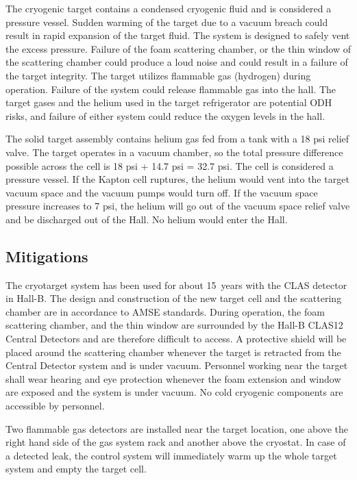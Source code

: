 The cryogenic target contains a condensed cryogenic fluid and is considered a pressure vessel. 
Sudden warming of the target due to a vacuum breach could result in rapid expansion of the 
target fluid. The system is designed to safely vent the excess pressure. Failure of the 
foam scattering chamber, or the thin window of the scattering chamber could produce a loud 
noise and could result in a failure of the target integrity. The target utilizes flammable 
gas (hydrogen) during operation. Failure of the system could release flammable gas into the 
hall. The target gases and the helium used in the target refrigerator are potential 
ODH risks, and failure of either system could reduce the oxygen levels in the hall.

The solid target assembly contains helium gas fed from a tank with a 18 psi relief valve.  The target operates in a vacuum chamber, so the total pressure difference possible across the cell is 18 psi + 14.7 psi = 32.7 psi.  The cell is considered a pressure vessel. If the Kapton cell ruptures, the helium would vent into the target vacuum space and the vacuum pumps would turn off.  If the vacuum space pressure increases to 7 psi, the helium will go out of the vacuum space relief valve and be discharged out of the Hall.  No helium would enter the Hall. 


\subsection{Mitigations}

The cryotarget system has been used for about 15~years with the CLAS detector in Hall-B. The 
design and construction of the new target cell and the scattering chamber are in accordance 
to AMSE standards. During operation, the foam scattering chamber, and the thin 
window are surrounded by the Hall-B CLAS12 Central Detectors and are therefore difficult to 
access. A protective shield will be placed around the scattering chamber whenever the target 
is retracted from the Central Detector system and is under vacuum. Personnel working near the 
target shall wear hearing and eye protection whenever the foam extension and window are 
exposed and the system is under vacuum. No cold cryogenic components are accessible by personnel. 

Two flammable gas detectors are installed near the target location, one above the right hand 
side of the gas system rack and another above the cryostat. In case of a detected leak, the 
control system will immediately warm up the whole target system and empty the target cell.

